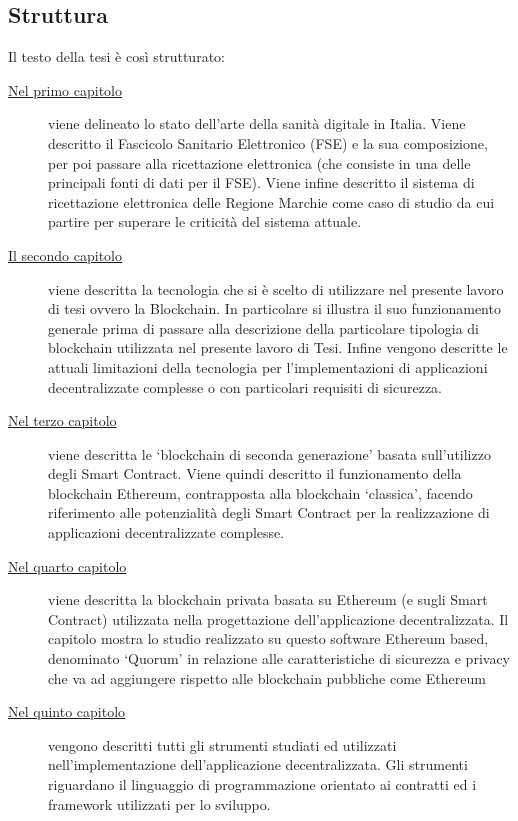 \subsection*{Struttura}
%
\par Il testo della tesi è così strutturato:
%
\begin{description}
	\item[{\hyperref[cap:sanitàdigitale]{Nel primo capitolo}}] viene delineato lo stato dell'arte della sanità digitale in Italia. Viene descritto il Fascicolo Sanitario Elettronico (FSE) e la sua composizione, per poi passare alla ricettazione elettronica (che consiste in una delle principali fonti di dati per il FSE). Viene infine descritto il sistema di ricettazione elettronica delle Regione Marchie come caso di studio da cui partire per superare le criticità del sistema attuale.
	\item[{\hyperref[cap:blockchain]{Il secondo capitolo}}] viene descritta la tecnologia che si è scelto di utilizzare nel presente lavoro di tesi ovvero la Blockchain. In particolare si illustra il suo funzionamento generale prima di passare alla descrizione della particolare tipologia di blockchain utilizzata nel presente lavoro di Tesi. Infine vengono descritte le attuali limitazioni della tecnologia per l'implementazioni di applicazioni decentralizzate complesse o con particolari requisiti di sicurezza.
	\item[{\hyperref[cap:ethereum]{Nel terzo capitolo}}] viene descritta le \enquote*{blockchain di seconda generazione} basata sull'utilizzo degli Smart Contract. Viene quindi descritto il funzionamento della blockchain Ethereum, contrapposta alla blockchain \enquote*{classica}, facendo riferimento alle potenzialità degli Smart Contract per la realizzazione di applicazioni decentralizzate complesse.
	\item[{\hyperref[cap:quorum]{Nel quarto capitolo}}] viene descritta la blockchain privata basata su Ethereum (e sugli Smart Contract) utilizzata nella progettazione dell'applicazione decentralizzata. Il capitolo mostra lo studio realizzato su questo software Ethereum based, denominato \enquote*{Quorum} in relazione alle caratteristiche di sicurezza e privacy che va ad aggiungere rispetto alle blockchain pubbliche come Ethereum
	\item[{\hyperref[cap:strumenti]{Nel quinto capitolo}}] vengono descritti tutti gli strumenti studiati ed utilizzati nell'implementazione dell'applicazione decentralizzata. Gli strumenti riguardano il linguaggio di programmazione orientato ai contratti ed i framework utilizzati per lo sviluppo.

\end{description}
